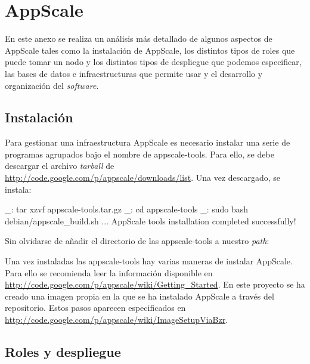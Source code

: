 \chapter{AppScale}
\label{anx:appscale}


En este anexo se realiza un análisis más detallado de algunos aspectos de AppScale tales como la instalación de AppScale, los distintos tipos de roles que puede tomar un nodo y los distintos tipos de despliegue que podemos especificar, las bases de datos e infraestructuras que permite usar y el desarrollo y organización del \emph{software}.


\section{Instalación}

Para gestionar una infraestructura AppScale es necesario instalar una serie de programas agrupados bajo el nombre de appscale-tools. Para ello, se debe descargar el archivo \emph{tarball} de \url{http://code.google.com/p/appscale/downloads/list}. Una vez descargado, se instala:

\begin{bashcode}
_: tar xzvf appscale-tools.tar.gz
_: cd appscale-tools
_: sudo bash debian/appscale_build.sh
...
AppScale tools installation completed successfully!
\end{bashcode}

Sin olvidarse de añadir el directorio de las appscale-tools a nuestro \emph{path}:


Una vez instaladas las appscale-tools hay varias maneras de instalar AppScale. Para ello se recomienda leer la información disponible en \url{http://code.google.com/p/appscale/wiki/Getting_Started}. En este proyecto se ha creado una imagen propia en la que se ha instalado AppScale a través del repositorio. Estos pasos aparecen especificados en \url{http://code.google.com/p/appscale/wiki/ImageSetupViaBzr}.


\section{Roles y despliegue}
\label{anx:appscale-roles}


